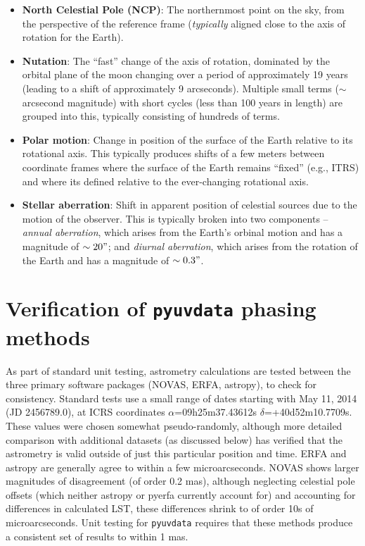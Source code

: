 \documentclass[11pt, oneside]{article}
\begin{document}
\begin{itemize}
    \item\textbf{North Celestial Pole (NCP)}: The northernmost point on the sky, from the perspective of the reference frame (\emph{typically} aligned close to the axis of rotation for the Earth).
    \item\textbf{Nutation}: The ``fast'' change of the axis of rotation, dominated by the orbital plane of the moon changing over a period of approximately 19 years (leading to a shift of approximately 9 arcseconds). Multiple small terms ($\sim$ arcsecond magnitude) with short cycles (less than 100 years in length) are grouped into this, typically consisting of hundreds of terms.
    \item\textbf{Polar motion}: Change in position of the surface of the Earth relative to its rotational axis. This typically produces shifts of a few meters between coordinate frames where the surface of the Earth remains ``fixed'' (e.g., ITRS) and where its defined relative to the ever-changing rotational axis.
    \item\textbf{Stellar aberration}: Shift in apparent position of celestial sources due to the motion of the observer. This is typically broken into two components -- \emph{annual aberration}, which arises from the Earth's orbinal motion and has a magnitude of $\sim20"$; and \emph{diurnal aberration}, which arises from the rotation of the Earth and has a magnitude of $\sim0.3"$. 
\end{itemize}

\section{Verification of \texttt{pyuvdata} phasing methods}\label{appx:verify}
As part of standard unit testing, astrometry calculations are tested between the three primary software packages (NOVAS, ERFA, astropy), to check for consistency. Standard tests use a small range of dates starting with May 11, 2014 (JD 2456789.0), at ICRS coordinates $\alpha$=09h25m37.43612s $\delta$=+40d52m10.7709s. These values were chosen somewhat pseudo-randomly, although more detailed comparison with additional datasets (as discussed below) has verified that the astrometry is valid outside of just this particular position and time. ERFA and astropy are generally agree to within a few microarcseconds. NOVAS shows larger magnitudes of disagreement (of order 0.2 mas), although neglecting celestial pole offsets (which neither astropy or pyerfa currently account for) and accounting for differences in calculated LST, these differences shrink to of order 10s of microarcseconds. Unit testing for \texttt{pyuvdata} requires that these methods produce a consistent set of results to within 1 mas.
\end{document}
